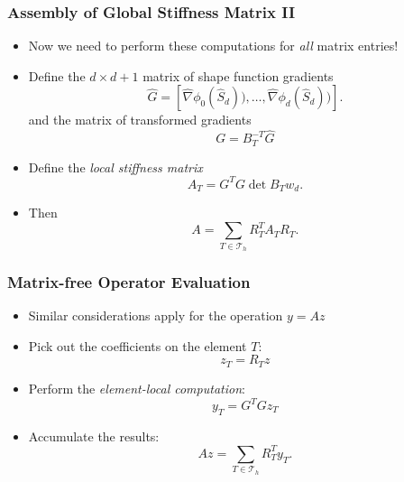 \documentclass[ignorenonframetext,11pt]{beamer}
\theoremstyle{definition}
\begin{document}
\begin{frame}
\frametitle{Assembly of Global Stiffness Matrix II}
\begin{itemize}
\item Now we need to perform these computations for {\em  all} matrix entries!
\item Define the $d\times d+1$ matrix of shape function gradients
\begin{equation*}
\hat G = \left[\hat\nabla\phi_0(\hat S_d)),\ldots,\hat\nabla\phi_d(\hat S_d))\right] .
\end{equation*}
and the matrix of transformed gradients $$G=B_T^{-T} \hat G$$
\item Define the {\em local stiffness matrix} 
\begin{equation*}
A_T = G^T G \det B_T w_d .
\end{equation*}
\item Then
\begin{equation*}
A =  \sum_{T\in\mathcal{T}_h} R_T^T A_T R_T .
\end{equation*}
\end{itemize}
\end{frame}

\begin{frame}
\frametitle{Matrix-free Operator Evaluation}
\begin{itemize}
\item Similar considerations apply for the operation $y=Az$
\item Pick out the coefficients on the element $T$:
$$z_T = R_T z$$
\item Perform the {\em element-local computation}:
\begin{equation*}
y_T = G^T G z_T
\end{equation*}
\item Accumulate the results:
\begin{equation*}
Az =  \sum_{T\in\mathcal{T}_h} R_T^T y_T.
\end{equation*}
\end{itemize}
\end{frame}
\end{document}

